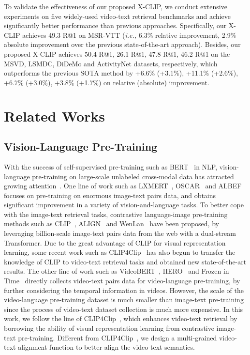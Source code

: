 \documentclass[sigconf]{acmart}
\begin{document}
To validate the effectiveness of our proposed X-CLIP, we conduct extensive experiments on five widely-used video-text retrieval benchmarks and achieve signiﬁcantly better performance than previous approaches. Specifically, our X-CLIP achieves 49.3 R@1 on MSR-VTT (\emph{i.e.,} 6.3\% relative improvement, 2.9\% absolute improvement over the previous state-of-the-art approach). Besides, our proposed X-CLIP achieves 50.4 R@1, 26.1 R@1, 47.8 R@1, 46.2 R@1 on the MSVD, LSMDC, DiDeMo and ActivityNet datasets, respectively, which outperforms the previous SOTA method by +6.6\% (+3.1\%), +11.1\% (+2.6\%), +6.7\% (+3.0\%), +3.8\% (+1.7\%) on relative (absolute) improvement.


\section{Related Works}

\subsection{Vision-Language Pre-Training}
With the success of self-supervised pre-training such as BERT~\citep{devlin2018bert} in NLP, vision-language pre-training on large-scale unlabeled cross-modal data has attracted growing attention~\citep{lu2019vilbert,xu-etal-2021-e2e,tan2019lxmert,li2020oscar,yu2020ernie,li2021align,radford2021learning,jia2021scaling,sun2019videobert,li2020hero}. One line of work such as LXMERT~\citep{tan2019lxmert}, OSCAR~\citep{li2020oscar} and ALBEF~\citep{li2021align} focuses on pre-training on enormous image-text pairs data, and obtains significant improvement in a variety of vision-and-language tasks. To better cope with the image-text retrieval tasks, contrastive language-image pre-training methods such as CLIP~\citep{radford2021learning}, ALIGN~\citep{jia2021scaling} and WenLan~\citep{huo2021wenlan} have been proposed, by leveraging billion-scale image-text pairs data from the web with a dual-stream Transformer. Due to the great advantage of CLIP for visual representation learning, some recent work such as CLIP4Clip~\citep{luo2021clip4clip} has also begun to transfer the knowledge of CLIP to video-text retrieval tasks and obtained new state-of-the-art results. The other line of work such as VideoBERT~\citep{sun2019videobert}, HERO~\citep{li2020hero} and Frozen in Time~\citep{bain2021frozen} directly collects video-text pairs data for video-language pre-training, by further considering the temporal information in videos. However, the scale of the video-language pre-training dataset is much smaller than image-text pre-training since the process of video-text dataset collection is much more expensive. In this work, we follow the line of CLIP4Clip~\citep{luo2021clip4clip}, which enhances video-text retrieval by borrowing the ability of visual representation learning from contrastive image-text pre-training. Different from CLIP4Clip~\citep{luo2021clip4clip}, we design a multi-grained video-text alignment function to better align the video-text semantics. 
\end{document}
